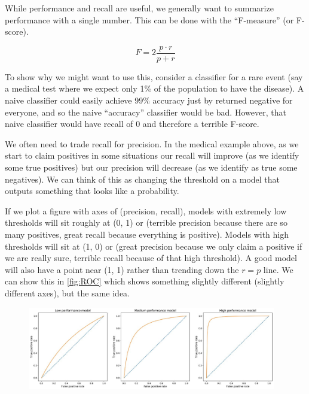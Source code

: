 \documentclass{article}
\begin{document}
While performance and recall are useful, we generally want to summarize performance with a single number. This can be done with the ``F-measure'' (or F-score).

\begin{equation}
    F = 2 \frac{p \cdot r}{p + r}
\end{equation}

To show why we might want to use this, consider a classifier for a rare event (say a medical test where we expect only 1\% of the population to have the disease).
A naive classifier could easily achieve 99\% accuracy just by returned negative for everyone, and so the naive ``accuracy'' classifier would be bad.
However, that naive classifier would have recall of $0$ and therefore a terrible F-score.

We often need to trade recall for precision. In the medical example above, as we start to claim positives in some situations our recall will improve (as we identify some true positives) but our precision will decrease (as we identify as true some negatives). We can think of this as changing the threshold on a model that outputs something that looks like a probability.

If we plot a figure with axes of (precision, recall), models with extremely low thresholds will sit roughly at (0, 1) or (terrible precision because there are so many positives, great recall because everything is positive). Models with high thresholds will sit at (1, 0) or (great precision because we only claim a positive if we are really sure, terrible recall because of that high threshold).
A good model will also have a point near (1, 1) rather than trending down the $r = p$ line.
We can show this in \autoref{fig:ROC} which shows something slightly different (slightly different axes), but the same idea.

\begin{figure}[h!]
    \centering
    \href{https://towardsdatascience.com/handling-imbalanced-datasets-in-machine-learning-7a0e84220f28}{
        \includegraphics[width=0.97\textwidth]{./figures/ROC.jpeg}
    }
    \label{fig:ROC}
\end{figure}
\end{document}

